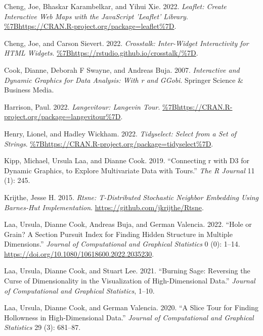 \begin{CSLReferences}{1}{0}
\leavevmode{}%
Cheng, Joe, Bhaskar Karambelkar, and Yihui Xie. 2022. \emph{Leaflet: Create Interactive Web Maps with the JavaScript 'Leaflet' Library}. \url{\%7Bhttps://CRAN.R-project.org/package=leaflet\%7D}.

\leavevmode{}%
Cheng, Joe, and Carson Sievert. 2022. \emph{Crosstalk: Inter-Widget Interactivity for HTML Widgets}. \url{\%7Bhttps://rstudio.github.io/crosstalk/\%7D}.

\leavevmode{}%
Cook, Dianne, Deborah F Swayne, and Andreas Buja. 2007. \emph{Interactive and Dynamic Graphics for Data Analysis: With r and GGobi}. Springer Science \& Business Media.

\leavevmode{}%
Harrison, Paul. 2022. \emph{Langevitour: Langevin Tour}. \url{\%7Bhttps://CRAN.R-project.org/package=langevitour\%7D}.

\leavevmode{}%
Henry, Lionel, and Hadley Wickham. 2022. \emph{Tidyselect: Select from a Set of Strings}. \url{\%7Bhttps://CRAN.R-project.org/package=tidyselect\%7D}.

\leavevmode{}%
Kipp, Michael, Ursula Laa, and Dianne Cook. 2019. {``Connecting r with D3 for Dynamic Graphics, to Explore Multivariate Data with Tours.''} \emph{The R Journal} 11 (1): 245.

\leavevmode{}%
Krijthe, Jesse H. 2015. \emph{{Rtsne}: T-Distributed Stochastic Neighbor Embedding Using Barnes-Hut Implementation}. \url{https://github.com/jkrijthe/Rtsne}.

\leavevmode{}%
Laa, Ursula, Dianne Cook, Andreas Buja, and German Valencia. 2022. {``Hole or Grain? A Section Pursuit Index for Finding Hidden Structure in Multiple Dimensions.''} \emph{Journal of Computational and Graphical Statistics} 0 (0): 1--14. \url{https://doi.org/10.1080/10618600.2022.2035230}.

\leavevmode{}%
Laa, Ursula, Dianne Cook, and Stuart Lee. 2021. {``Burning Sage: Reversing the Curse of Dimensionality in the Visualization of High-Dimensional Data.''} \emph{Journal of Computational and Graphical Statistics}, 1--10.

\leavevmode{}%
Laa, Ursula, Dianne Cook, and German Valencia. 2020. {``A Slice Tour for Finding Hollowness in High-Dimensional Data.''} \emph{Journal of Computational and Graphical Statistics} 29 (3): 681--87.


\end{CSLReferences}
